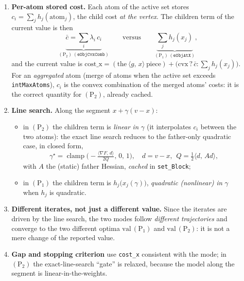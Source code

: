 \documentclass[11pt,a4paper]{article}
\newcommand{\clamp}{\operatorname{clamp}}
\newcommand{\ip}[2]{\langle #1,\, #2\rangle}
\newcommand{\code}[1]{\texttt{#1}}
\newcommand{\Pone}{(\mathrm{P}_1)}
\newcommand{\Ptwo}{(\mathrm{P}_2)}
\theoremstyle{plain}
\theoremstyle{remark}
\begin{document}
\begin{enumerate}[leftmargin=1.4em]
\item \textbf{Per-atom stored cost.} Each atom of the active set stores
  $c_i = \sum_j h_j(\text{atom}_j)$, the child cost \emph{at the vertex}. The
  children term of the current value is then
  \[
    \underbrace{\bar c = \sum_i \lambda_i\, c_i}_{\Ptwo\ (\code{eObjCvxComb})}
    \qquad\text{versus}\qquad
    \underbrace{\sum_j h_j(x_j)}_{\Pone\ (\code{eObjAtX})},
  \]
  and the current value is
  $\mathrm{cost\_x} = (\text{the}\ \ip{g}{x}\ \text{piece}) + \big(\text{cvx}\,?\,
  \bar c:\sum_j h_j(x_j)\big)$. For an \emph{aggregated} atom (merge of atoms when
  the active set exceeds \code{intMaxAtoms}), $c_i$ is the convex combination of
  the merged atoms' costs: it is the correct quantity for $\Ptwo$, already cached.

\item \textbf{Line search.} Along the segment $x+\gamma(v-x)$:
  \begin{itemize}[nosep]
    \item in $\Ptwo$ the children term is \emph{linear in $\gamma$} (it
      interpolates $c_i$ between the two atoms): the exact line search reduces to
      the father-only quadratic case, in closed form,
      \begin{equation}\label{eq:ls}
        \gamma^\star = \clamp\!\Big(-\tfrac{\ip{\nabla F}{d}}{2Q},\,0,\,1\Big),\quad
        d=v-x,\ \ Q=\tfrac12\ip{d}{A d},
      \end{equation}
      with $A$ the (static) father Hessian, \emph{cached} in \code{set\_Block};
    \item in $\Pone$ the children term is $h_j\big(x_j(\gamma)\big)$,
      \emph{quadratic (nonlinear) in $\gamma$} when $h_j$ is quadratic.
  \end{itemize}

\item \textbf{Different iterates, not just a different value.} Since the iterates
  are driven by the line search, the two modes follow \emph{different
  trajectories} and converge to the two different optima $\mathrm{val}\,\Pone$ and
  $\mathrm{val}\,\Ptwo$: it is not a mere change of the reported value.

\item \textbf{Gap and stopping criterion} use \texttt{cost\_x} consistent with the
  mode; in $\Ptwo$ the exact-line-search ``gate'' is relaxed, because the model
  along the segment is linear-in-the-weights.
\end{enumerate}
\end{document}
